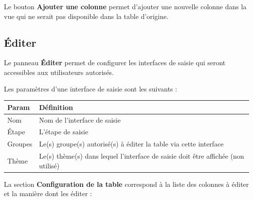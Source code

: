\documentclass[letterpaper,10pt,english]{sphinxmanual}
\begin{document}
Le bouton \textbf{Ajouter une colonne} permet d'ajouter une nouvelle
colonne dans la vue qui ne serait pas disponible dans la table
d'origine.


\subsection{Éditer}
\label{tables/infopanel:editer}
Le panneau \textbf{Éditer} permet de configurer les interfaces de saisie
qui seront accessibles aux utilisateurs autorisés.


Les paramètres d'une interface de saisie sont les suivants :

\begin{tabulary}{\linewidth}{|L|L|}
\hline

\textbf{Param}
 & 
\textbf{Définition}
\\
\hline
Nom
 & 
Nom de l'interface de saisie
\\
\hline
Étape
 & 
L'étape de saisie
\\
\hline
Groupes
 & 
Le(s) groupe(s) autorisé(s) à éditer la table via cette interface
\\
\hline
Thème
 & 
Le(s) thème(s) dans lequel l'interface de saisie doit être affichée (non utilisé)
\\
\hline\end{tabulary}


La section \textbf{Configuration de la table} correspond à la liste des
colonnes à éditer et la manière dont les éditer :
\end{document}

